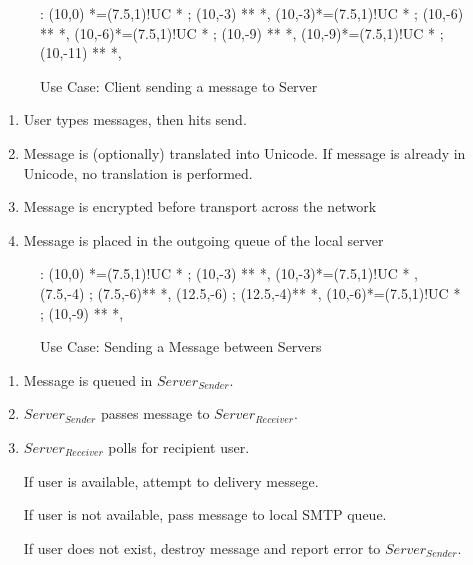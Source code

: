 

\begin{figure}[hbt]

\xy<1cm,0cm>:
(10,0) *=(7.5,1)!UC *\frm{-} ;
(10,-3) **\dir{-} *\dir{>},
(10,-3)*=(7.5,1)!UC *\frm{=} ; 
(10,-6) **\dir{-} *\dir{>},
(10,-6)*=(7.5,1)!UC *\frm{-} ; 
(10,-9) **\dir{-} *\dir{>},
(10,-9)*=(7.5,1)!UC *\frm{-} ; 
(10,-11) **\dir{=} *\dir{>},
\endxy

\caption{Use Case: Client sending a message to Server}

\end{figure}

\begin{enumerate}

\item User types messages, then hits send.

\item Message is (optionally) translated into Unicode. If message is
already in Unicode, no translation is performed.

\item Message is encrypted before transport across the network

\item Message is placed in the outgoing queue of the local server

\end{enumerate}


\begin{figure}[hbt]

\xy<1cm,0cm>:
(10,0) *=(7.5,1)!UC *\frm{-} ;
(10,-3) **\dir{-} *\dir{>},
(10,-3)*=(7.5,1)!UC *\frm{-} , 
(7.5,-4) ; (7.5,-6)**\dir{-} *\dir{>},
(12.5,-6) ; (12.5,-4)**\dir{--} *\dir{>},
(10,-6)*=(7.5,1)!UC *\frm{-} ; 
(10,-9) **\dir{=} *\dir{>},
\endxy

\caption{Use Case: Sending a Message between Servers}

\end{figure}

\begin{enumerate}

\item Message is queued in $Server_{Sender}$.

\item $Server_{Sender}$ passes message to $Server_{Receiver}$.

\item $Server_{Receiver}$ polls for recipient user. 

\subitem If user is available, attempt to delivery messege. 

\subitem If user is not available, pass message to local SMTP queue. 

\subitem If user does not exist, destroy message and report error to $Server_{Sender}$.

\end{enumerate}


